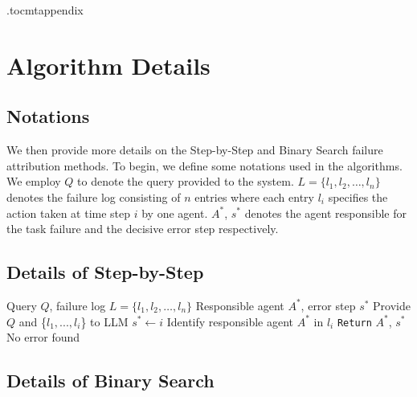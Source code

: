 \onecolumn
\etocdepthtag.toc{mtappendix}

\renewcommand{\contentsname}{Appendix}
\tableofcontents
\appendix


\section{Algorithm Details}
\label{app:algorithm_details}
\subsection{Notations}
We then provide more details on the Step-by-Step and Binary Search failure attribution methods. 
To begin, we define some notations used in the algorithms.
We employ $Q$ to denote the query provided to the system. 
$L = \{l_1, l_2, \dots, l_n\}$ denotes the failure log consisting of $n$ entries where each entry $l_i$ specifies the action taken at time step $i$ by one agent. $A^*$, $s^*$ denotes the agent responsible for the task failure and the decisive error step respectively. 

\subsection{Details of Step-by-Step}

\begin{algorithm}[htb]
\setlength{\lineskip}{0.1em}
\setlength{\lineskiplimit}{0.1em}
\caption{Step-by-Step}
\begin{algorithmic}[1]
\REQUIRE Query $Q$, failure log $L = \{l_1, l_2, \dots, l_n\}$
\ENSURE Responsible agent $A^*$, error step $s^*$
    \STATE Provide $Q$ and \{$l_1, ..., l_i$\} to LLM
        \STATE $s^* \leftarrow i$
        \STATE Identify responsible agent $A^*$ in $l_i$
        \STATE \texttt{Return} $A^*$, $s^*$
    \ENDIF
\ENDFOR
\STATE No error found
\end{algorithmic}
\end{algorithm}

\subsection{Details of Binary Search}

